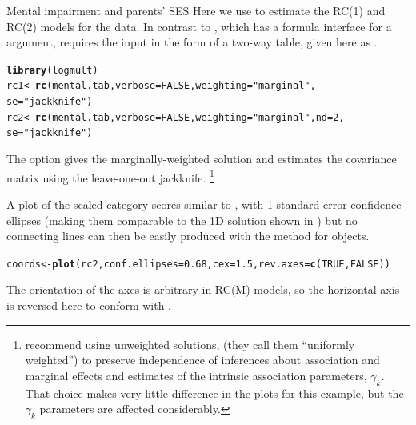 \documentclass[11pt]{book}\usepackage[]{graphicx}\usepackage[]{color}
\makeatletter
\newcommand{\hlnum}[1]{\textcolor[rgb]{0.686,0.059,0.569}{#1}}%
\newcommand{\hlstr}[1]{\textcolor[rgb]{0.192,0.494,0.8}{#1}}%
\newcommand{\hlstd}[1]{\textcolor[rgb]{0.345,0.345,0.345}{#1}}%
\newcommand{\hlkwb}[1]{\textcolor[rgb]{0.69,0.353,0.396}{#1}}%
\newcommand{\hlkwc}[1]{\textcolor[rgb]{0.333,0.667,0.333}{#1}}%
\newcommand{\hlkwd}[1]{\textcolor[rgb]{0.737,0.353,0.396}{\textbf{#1}}}%
\newenvironment{kframe}{%
 \def\at@end@of@kframe{}%
 \ifinner\ifhmode%
  \def\at@end@of@kframe{\end{minipage}}%
  \begin{minipage}{\columnwidth}%
 \fi\fi%
 \def\FrameCommand##1{\hskip\@totalleftmargin \hskip-\fboxsep
 \colorbox{shadecolor}{##1}\hskip-\fboxsep
     \hskip-\linewidth \hskip-\@totalleftmargin \hskip\columnwidth}%
 \MakeFramed {\advance\hsize-\width
   \@totalleftmargin\z@ \linewidth\hsize
   \@setminipage}}%
 {\par\unskip\endMakeFramed%
 \at@end@of@kframe}
\newenvironment{knitrout}{}{} %
\renewenvironment{knitrout}{\small\renewcommand{\baselinestretch}{.85}}{} %
\makeatother
\begin{document}
\begin{Example}[mental6]{Mental impairment and parents' SES}
Here we use  to estimate the RC(1) and RC(2) models for the
 data.  In contrast to , which has a
formula interface for a  argument,
 requires the input in the form of a two-way table,
given here as .
\begin{knitrout}
\color{fgcolor}\begin{kframe}
\begin{alltt}
\hlkwd{library}\hlstd{(logmult)}
\hlstd{rc1} \hlkwb{<-} \hlkwd{rc}\hlstd{(mental.tab,} \hlkwc{verbose}\hlstd{=}\hlnum{FALSE}\hlstd{,} \hlkwc{weighting}\hlstd{=}\hlstr{"marginal"}\hlstd{,}
          \hlkwc{se}\hlstd{=}\hlstr{"jackknife"}\hlstd{)}
\hlstd{rc2} \hlkwb{<-} \hlkwd{rc}\hlstd{(mental.tab,} \hlkwc{verbose}\hlstd{=}\hlnum{FALSE}\hlstd{,} \hlkwc{weighting}\hlstd{=}\hlstr{"marginal"}\hlstd{,} \hlkwc{nd}\hlstd{=}\hlnum{2}\hlstd{,}
          \hlkwc{se}\hlstd{=}\hlstr{"jackknife"}\hlstd{)}
\end{alltt}
\end{kframe}
\end{knitrout}
\noindent The option  gives the marginally-weighted solution
and  estimates the covariance matrix using the
leave-one-out jackknife.%
\footnote{
\citet{BeckerClogg:1989} recommend using unweighted solutions, 
(they call them ``uniformly weighted'')
to preserve independence of inferences about association and marginal effects
and estimates of the intrinsic association parameters, $\gamma_k$.
That choice makes very little difference in the plots for this example,
but the $\gamma_k$ parameters are affected considerably.
}

A plot of the scaled category scores similar to ,
with 1 standard error confidence ellipses
(making them comparable to the 1D solution shown in )
but no connecting lines
can then be easily produced with
the  method for  objects.
\begin{knitrout}
\color{fgcolor}\begin{kframe}
\begin{alltt}
\hlstd{coords}  \hlkwb{<-} \hlkwd{plot}\hlstd{(rc2,} \hlkwc{conf.ellipses}\hlstd{=}\hlnum{0.68}\hlstd{,} \hlkwc{cex}\hlstd{=}\hlnum{1.5}\hlstd{,} \hlkwc{rev.axes}\hlstd{=}\hlkwd{c}\hlstd{(}\hlnum{TRUE}\hlstd{,} \hlnum{FALSE}\hlstd{))}
\end{alltt}
\end{kframe}
\end{knitrout}
\noindent The orientation of the axes is arbitrary in RC(M) models, so the horizontal
axis is reversed here to conform with .


\end{Example}
\end{document}
